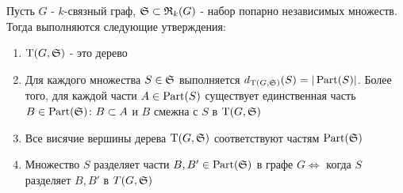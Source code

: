 \documentclass[../main.tex]{subfiles}
\begin{document}
\begin{thm}[Теорема 1.1] \label{theorem:1_1}
	Пусть $G$ -  $k$-связный граф, $\S \subset \R_k(G)$ - набор попарно независимых множеств.
	Тогда выполняются следующие утверждения:

	 \begin{enumerate}
		 \item $\wT(G, \S)$ - это дерево \label{stmt:theorem_1_1_1}
		 \item Для каждого множества $S \in \S$ выполняется  $d_{\wT(G, \S)}(S) = |\Part(S)|$.
			 Более того, для каждой части  $A \in \Part(S)$ существует единственная часть  $B \in \Part(\S) \colon B \subset A$ и  $B$ смежна с  $S$ в  $\wT(G, \S)$ \label{stmt:theorem_1_1_2}
		 \item Все висячие вершины дерева  $\wT(G, \S)$ соответствуют частям  $\Part(\S)$ \label{stmt:theorem_1_1_3}
		 \item Множество  $S$ разделяет части  $B, B' \in \Part(\S)$ в графе  $G \iff$ когда  $S$ разделяет  $B, B'$ в  $T(G, \S)$ \label{stmt:theorem_1_1_4}
	\end{enumerate}
	
\end{thm}
\end{document}
